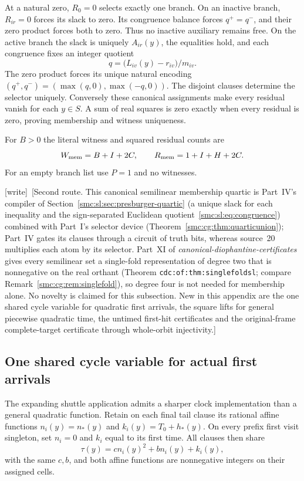 \documentclass[11pt,letterpaper]{article}
\numberwithin{equation}{section}
\theoremstyle{definition}
\theoremstyle{remark}
\newcommand{\wtag}{\textup{[write]}}
\begin{document}
At a natural zero, $R_0=0$ selects exactly one branch. On an inactive branch, $R_{ir}=0$ forces its slack to zero. Its congruence balance forces $q^+=q^-$, and their zero product forces both to zero. Thus no inactive auxiliary remains free. On the active branch the slack is uniquely $A_{ir}(y)$, the equalities hold, and each congruence fixes an integer quotient
\[
 q=\bigl(L_{iv}(y)-r_{iv}\bigr)/m_{iv}.
\]
The zero product forces its unique natural encoding $(q^+,q^-)=(\max(q,0),\max(-q,0))$. The disjoint clauses determine the selector uniquely. Conversely these canonical assignments make every residual vanish for each $y\in S$. A sum of real squares is zero exactly when every residual is zero, proving membership and witness uniqueness.

For $B>0$ the literal witness and squared residual counts are
\begin{equation}\label{smc:og:eq:memcounts}
 W_{\rm mem}=B+I+2C,\qquad R_{\rm mem}=1+I+H+2C.
\end{equation}
For an empty branch list use $P=1$ and no witnesses.

\wtag\ [Second route. This canonical semilinear membership quartic is Part~IV's compiler of Section~\ref{smc:sl:sec:presburger-quartic} (a unique slack for each inequality and the sign-separated Euclidean quotient~\eqref{smc:sl:eq:congruence}) combined with Part~I's selector device (Theorem~\ref{smc:cg:thm:quarticunion}); Part~IV gates its clauses through a circuit of truth bits, whereas source~20 multiplies each atom by its selector. Part~XI of \emph{canonical-diophantine-certificates} gives every semilinear set a single-fold representation of degree two that is nonnegative on the real orthant (Theorem \texttt{cdc:of:thm:singlefoldsl}; compare Remark~\ref{smc:cg:rem:singlefold}), so degree four is not needed for membership alone. No novelty is claimed for this subsection. New in this appendix are the one shared cycle variable for quadratic first arrivals, the square lifts for general piecewise quadratic time, the untimed first-hit certificates and the original-frame complete-target certificate through whole-orbit injectivity.]

\subsection{One shared cycle variable for actual first arrivals}
The expanding shuttle application admits a sharper clock implementation than a general quadratic function. Retain on each final tail clause its rational affine functions $n_i(y)=n_*(y)$ and $k_i(y)=T_0+h_*(y)$. On every prefix first visit singleton, set $n_i=0$ and $k_i$ equal to its first time. All clauses then share
\[
 \tau(y)=cn_i(y)^2+bn_i(y)+k_i(y),
\]
with the same $c,b$, and both affine functions are nonnegative integers on their assigned cells.
\end{document}
